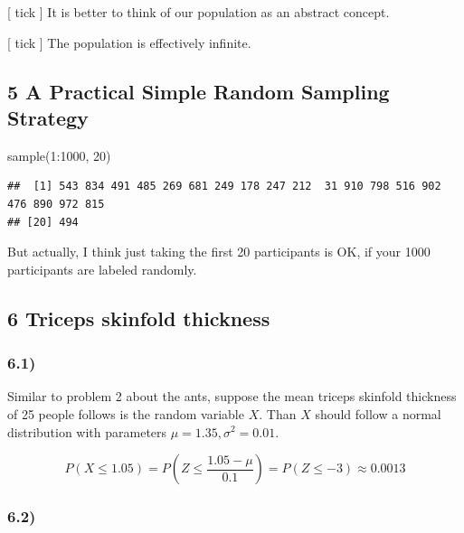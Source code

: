 \documentclass[
]{article}
\newenvironment{Shaded}{\begin{snugshade}}{\end{snugshade}}
\newcommand{\DecValTok}[1]{\textcolor[rgb]{0.00,0.00,0.81}{#1}}
\newcommand{\FunctionTok}[1]{\textcolor[rgb]{0.00,0.00,0.00}{#1}}
\newcommand{\NormalTok}[1]{#1}
\newcommand{\SpecialCharTok}[1]{\textcolor[rgb]{0.00,0.00,0.00}{#1}}
\begin{document}
{[} tick {]} It is better to think of our population as an abstract
concept.

{[} tick {]} The population is effectively infinite.

\hypertarget{a-practical-simple-random-sampling-strategy}{%
\subsection{5 A Practical Simple Random Sampling
Strategy}\label{a-practical-simple-random-sampling-strategy}}

\begin{Shaded}
\begin{Highlighting}[]
\FunctionTok{sample}\NormalTok{(}\DecValTok{1}\SpecialCharTok{:}\DecValTok{1000}\NormalTok{, }\DecValTok{20}\NormalTok{)}
\end{Highlighting}
\end{Shaded}

\begin{verbatim}
##  [1] 543 834 491 485 269 681 249 178 247 212  31 910 798 516 902 476 890 972 815
## [20] 494
\end{verbatim}

But actually, I think just taking the first 20 participants is OK, if
your 1000 participants are labeled randomly.

\hypertarget{triceps-skinfold-thickness}{%
\subsection{6 Triceps skinfold
thickness}\label{triceps-skinfold-thickness}}

\hypertarget{section-6}{%
\subsubsection{6.1)}\label{section-6}}

Similar to problem 2 about the ants, suppose the mean triceps skinfold
thickness of 25 people follows is the random variable \(X\). Than \(X\)
should follow a normal distribution with parameters
\(\mu = 1.35, \sigma^2 = 0.01\).

\[
P(X \leq 1.05) = P(Z \leq \frac{1.05 - \mu}{0.1} )  = P(Z \leq -3) \approx 0.0013
\]

\hypertarget{section-7}{%
\subsubsection{6.2)}\label{section-7}}
\end{document}
